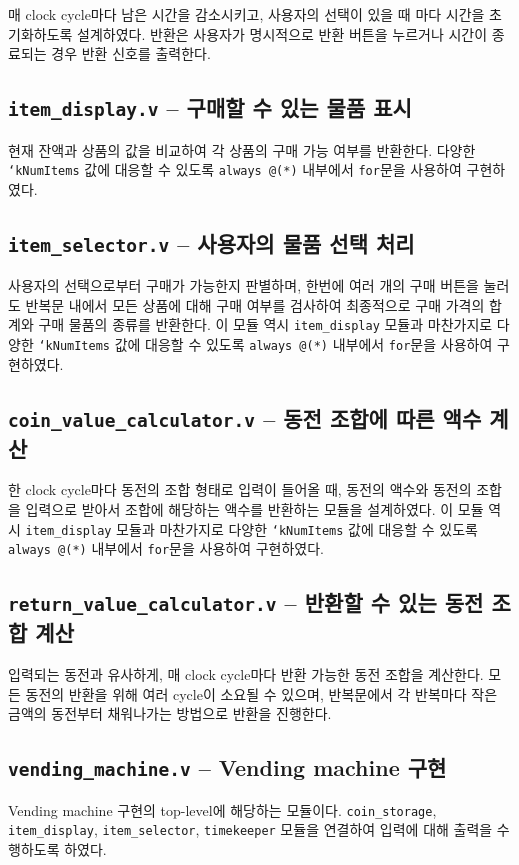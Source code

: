 \documentclass{scrartcl}
\begin{document}
매 clock cycle마다 남은 시간을 감소시키고, 사용자의 선택이 있을 때 마다 시간을 초기화하도록 설계하였다.
반환은 사용자가 명시적으로 반환 버튼을 누르거나 시간이 종료되는 경우 반환 신호를 출력한다.

\subsection{\texttt{item\_display.v} -- 구매할 수 있는 물품 표시}

현재 잔액과 상품의 값을 비교하여 각 상품의 구매 가능 여부를 반환한다. 다양한 \texttt{`kNumItems} 값에 대응할 수 있도록
\texttt{always @(*)} 내부에서 \texttt{for}문을 사용하여 구현하였다.

\subsection{\texttt{item\_selector.v} -- 사용자의 물품 선택 처리}

사용자의 선택으로부터 구매가 가능한지 판별하며, 한번에 여러 개의 구매 버튼을 눌러도 반복문 내에서
모든 상품에 대해 구매 여부를 검사하여 최종적으로 구매 가격의 합계와 구매 물품의 종류를 반환한다. 이 모듈 역시
\texttt{item\_display} 모듈과 마찬가지로 다양한 \texttt{`kNumItems} 값에 대응할 수 있도록
\texttt{always @(*)} 내부에서 \texttt{for}문을 사용하여 구현하였다.

\subsection{\texttt{coin\_value\_calculator.v} -- 동전 조합에 따른 액수 계산}
한 clock cycle마다 동전의 조합 형태로 입력이 들어올 때, 동전의 액수와 동전의 조합을 입력으로 받아서
조합에 해당하는 액수를 반환하는 모듈을 설계하였다. 이 모듈 역시 \texttt{item\_display} 모듈과 마찬가지로 다양한
\texttt{`kNumItems} 값에 대응할 수 있도록 \texttt{always @(*)} 내부에서 \texttt{for}문을 사용하여
구현하였다.

\subsection{\texttt{return\_value\_calculator.v} -- 반환할 수 있는 동전 조합 계산}

입력되는 동전과 유사하게, 매 clock cycle마다 반환 가능한 동전 조합을 계산한다.
모든 동전의 반환을 위해 여러 cycle이 소요될 수 있으며, 반복문에서 각 반복마다 작은 금액의 동전부터 채워나가는 방법으로 반환을
진행한다.

\subsection{\texttt{vending\_machine.v} -- Vending machine 구현}
Vending machine 구현의 top-level에 해당하는 모듈이다. \texttt{coin\_storage},
\texttt{item\_display}, \texttt{item\_selector}, \texttt{timekeeper} 모듈을 연결하여
입력에 대해 출력을 수행하도록 하였다.
\end{document}

